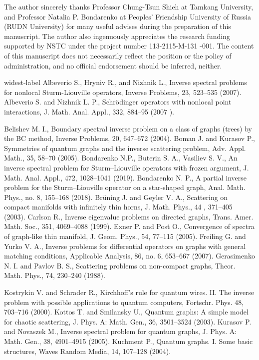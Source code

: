 \documentclass[10pt,a4paper]{article}
\theoremstyle{plain}
\theoremstyle{definition}
\theoremstyle{remark}
\numberwithin{equation}{section}
\newenvironment{acknowledgement}[1][Acknowledgement
]{\begin{trivlist} \item[\hskip \labelsep {\bfseries
#1}]}{\end{trivlist}}
\begin{document}
\begin{acknowledgement}
The author sincerely  thanks Professor Chung-Tsun Shieh at Tamkang University, and Professor Natalia P. Bondarenko at Peoples' Friendship University of Russia (RUDN University) for many useful advises during the preparation of this manuscript. The author also ingenuously appreciates the research funding supported by NSTC under the project number 113-2115-M-131 -001. The content of this manuscript does not necessarily reflect the position or the policy of administration, and no official endorsement should be inferred, neither.


\end{acknowledgement}

\begin{thebibliography}{widest-label}
Albeverio S., Hryniv R., and Nizhnik L., Inverse spectral problems for nonlocal Sturm-Liouville operators, Inverse Problems, 23, 523--535 (2007).
Albeverio S. and Nizhnik L. P., Schr\"{o}dinger operators with nonlocal point interactions, J. Math. Anal. Appl., 332, 884--95 (2007 ).


Belishev M. I., Boundary spectral inverse problem on a class of graphs (trees) by the BC method, Inverse Problems, 20, 647--672 (2004).
Boman J. and Kurasov P., Symmetries of quantum graphs and the inverse scattering problem, Adv. Appl. Math., 35, 58--70 (2005).
Bondarenko N.P., Buterin S. A., Vasiliev S. V., An inverse spectral problem for Sturm--Liouville operators with frozen
argument, J. Math. Anal. Appl., 472, 1028--1041 (2019).
Bondarenko N. P., A partial inverse problem for the Sturm--Liouville operator on a star-shaped graph, Anal. Math.
Phys., no. 8, 155--168 (2018).
Br\"{u}ning J. and Geyler  V. A., Scattering on compact manifolds with infinitely thin horns, J. Math. Phys., 44 , 371--405 (2003).
Carlson R., Inverse eigenvalue problems on directed graphs, Trans. Amer. Math. Soc., 351, 4069--4088 (1999).
Exner P.  and Post O., Convergence of spectra of graph-like thin manifold, J. Geom. Phys., 54, 77--115 (2005).
Freiling G. and Yurko V. A., Inverse problems for differential operators on graphs with general matching conditions, Applicable Analysis, 86, no. 6, 653--667 (2007).
Gerasimenko N. I. and Pavlov B. S., Scattering problems on non-compact graphs, Theor. Math. Phys., 74, 230--240  (1988).

Kostrykin V. and Schrader R., Kirchhoff's rule for quantum wires. II. The inverse problem with possible applications to quantum computers, Fortschr. Phys. 48, 703--716 (2000).
Kottos T. and Smilansky U., Quantum graphs: A simple model for chaotic scattering, J. Phys. A: Math. Gen., 36, 3501--3524  (2003).
Kurasov P. and Novaszek M., Inverse spectral problem for quantum graphs, J. Phys. A: Math. Gen., 38, 4901--4915 (2005).
Kuchment P., Quantum graphs. I. Some basic structures, Waves Random Media, 14, 107--128 (2004).


\end{thebibliography}
\end{document}
